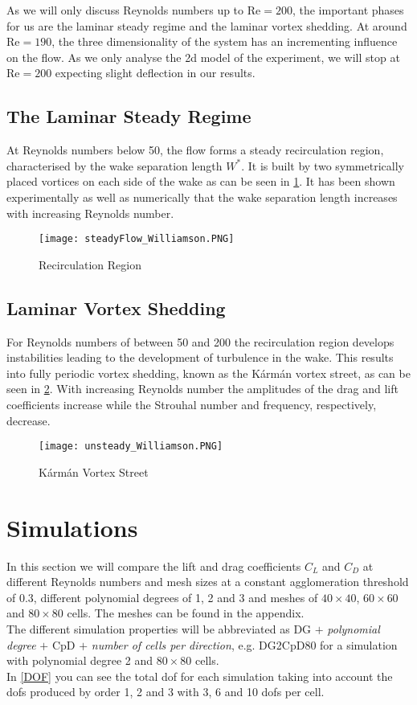 	As we will only discuss Reynolds numbers up to $\text{Re} = 200$, the important phases for us are the laminar steady regime and the laminar vortex shedding. At around $\text{Re} = 190$, the three dimensionality of the system has an incrementing influence on the flow. As we only analyse the \gls{2d} model of the experiment, we will stop at $\text{Re} = 200$ expecting slight deflection in our results.
	
	\subsection{The Laminar Steady Regime}
	
	At Reynolds numbers below 50, the flow forms a steady recirculation region, characterised by the wake separation length  $W^*$. It is built by two symmetrically placed vortices on each side of the wake as can be seen in \cref{fig:steady}. It has been shown experimentally as well as numerically that the wake separation length increases with increasing Reynolds number. 
		\begin{figure}[htp]
			\centering
			\texttt{[image: steadyFlow\_Williamson.PNG]}
			\caption{Recirculation Region \cite{williamson1996vortex}}
			\label{fig:steady}
		\end{figure}
	\subsection{Laminar Vortex Shedding}
	For Reynolds numbers of between 50 and 200 the recirculation region develops instabilities leading to the development of turbulence in the wake. This results into fully periodic vortex shedding, known as the Kármán vortex street, as can be seen in \cref{fig:unsteady}. With increasing Reynolds number the amplitudes of the drag and lift coefficients increase while the Strouhal number and frequency, respectively, decrease.
	
		\begin{figure}[htp]
			\centering
			\texttt{[image: unsteady\_Williamson.PNG]}
			\caption{Kármán Vortex Street \cite{williamson1996vortex}}
			\label{fig:unsteady}
		\end{figure}
		
\section{Simulations}
	In this section we will compare the lift and drag coefficients $C_L$ and $C_D$ at different Reynolds numbers and mesh sizes at a constant agglomeration threshold of $0.3$, different polynomial degrees of 1, 2 and 3 and meshes of $40 \times 40$, $60 \times 60$ and $80 \times 80$ cells. The meshes can be found in the appendix. \\\indent
	The different simulation properties will be abbreviated as DG $+$ \textit{polynomial degree} $+$ CpD $+$ \textit{number of cells per direction}, e.g. DG2CpD80 for a simulation with polynomial degree 2 and $80 \times 80$ cells.\\
	In \cref{DOF} you can see the total \gls{dof} for each simulation taking into account the \gls{dof}s produced by order 1, 2 and 3 with 3, 6 and 10 \gls{dof}s per cell.
	

